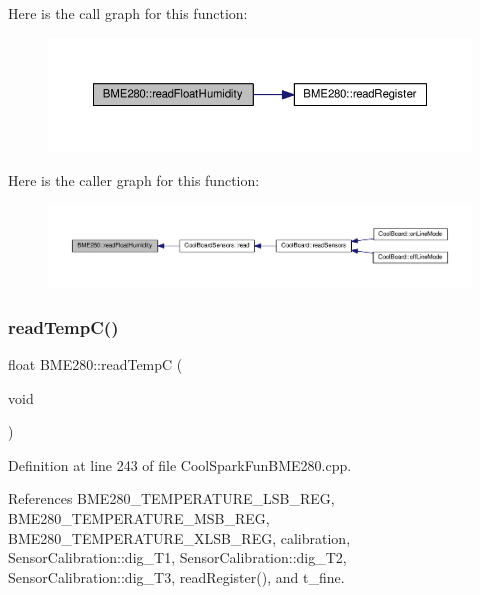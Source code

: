 Here is the call graph for this function\+:
\nopagebreak
\begin{figure}[H]
\begin{center}
\leavevmode
\includegraphics[width=350pt]{df/dcf/class_b_m_e280_a42ea7232039eebf5aadb391ef6132c35_cgraph}
\end{center}
\end{figure}
Here is the caller graph for this function\+:
\nopagebreak
\begin{figure}[H]
\begin{center}
\leavevmode
\includegraphics[width=350pt]{df/dcf/class_b_m_e280_a42ea7232039eebf5aadb391ef6132c35_icgraph}
\end{center}
\end{figure}
\mbox{\label{class_b_m_e280_afffdd1d7ded9e1f92200e70669019d97}} 
\subsubsection{\texorpdfstring{read\+Temp\+C()}{readTempC()}}
{\footnotesize\ttfamily float B\+M\+E280\+::read\+TempC (\begin{DoxyParamCaption}\item[{void}]{ }\end{DoxyParamCaption})}



Definition at line 243 of file Cool\+Spark\+Fun\+B\+M\+E280.\+cpp.



References B\+M\+E280\+\_\+\+T\+E\+M\+P\+E\+R\+A\+T\+U\+R\+E\+\_\+\+L\+S\+B\+\_\+\+R\+EG, B\+M\+E280\+\_\+\+T\+E\+M\+P\+E\+R\+A\+T\+U\+R\+E\+\_\+\+M\+S\+B\+\_\+\+R\+EG, B\+M\+E280\+\_\+\+T\+E\+M\+P\+E\+R\+A\+T\+U\+R\+E\+\_\+\+X\+L\+S\+B\+\_\+\+R\+EG, calibration, Sensor\+Calibration\+::dig\+\_\+\+T1, Sensor\+Calibration\+::dig\+\_\+\+T2, Sensor\+Calibration\+::dig\+\_\+\+T3, read\+Register(), and t\+\_\+fine.



